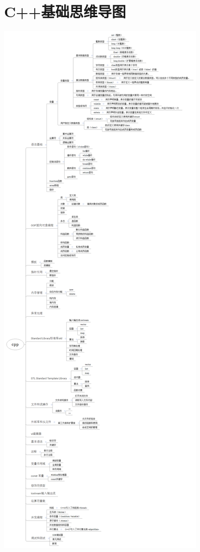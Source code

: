 \documentclass[12pt,twiside,a4paper]{ctexbook}
\numberwithin{chapter}{part}
\begin{document}

\chapter{C++基础思维导图}
\includegraphics[scale=0.15]{cpp.png}
\end{document}
